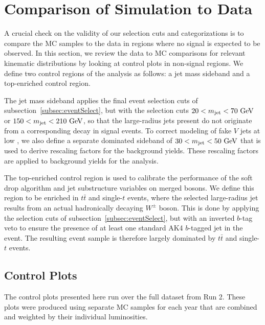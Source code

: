 
\section{Comparison of Simulation to Data}
\label{sec:comp}

A crucial check on the validity of our selection cuts and categorizations is to compare the MC samples to the data in regions where no signal is expected to be observed.
In this section, we review the data to MC comparisons for relevant kinematic distributions by looking at control plots in non-signal regions.
We define two control regions of the analysis as follows: a jet mass sideband and a top-enriched control region.

The jet mass sideband applies the final event selection cuts of subsection~\ref{subsec:eventSelect}, but with the \MJ selection cuts $20<\MJ<70\unit{GeV}$ or $150<\MJ<210\unit{GeV}$, so that the \Vhad large-radius jets present do not originate from a corresponding \VorH decay in signal events.
To correct modeling of fake $V$ jets at low \pt, we also define a separate \Wjets dominated sideband of $30<\MJ<50\unit{GeV}$ that is used to derive rescaling factors for the \Wjets background yields.
These rescaling factors are applied to \Wjets background yields for the analysis.

The top-enriched control region is used to calibrate the performance of the soft drop algorithm and jet substructure variables on merged bosons.
We define this region to be enriched in $t\bar{t}$ and single-$t$ events, where the selected large-radius jet results from an actual hadronically decaying $W^\pm$ boson.
This is done by applying the selection cuts of subsection~\ref{subsec:eventSelect}, but with an inverted $b$-tag veto to ensure the presence of at least one standard AK4 $b$-tagged jet in the event.
The resulting event sample is therefore largely dominated by $t\bar{t}$ and single-$t$ events.

\subsection{Control Plots}

The control plots presented here run over the full dataset from Run 2.
These plots were produced using separate MC samples for each year that are combined and weighted by their individual luminosities.

